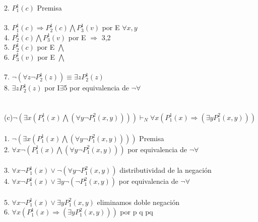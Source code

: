 \documentclass{article}
\begin{document}
2. \hspace{3mm} $P^1_1(c)$ \hspace{5.1cm} Premisa\\ \\
3. \hspace{3mm} $P^1_1(c) \Rightarrow P^1_2(c)\bigwedge P^1_3(v)$ \hspace{2.4cm} por E $\forall x,y$\\
4. \hspace{3mm} $P^1_2(c)\bigwedge P^1_3(v)$ \hspace{3.8cm} por E $\Rightarrow$ 3,2\\
5. \hspace{3mm} $P^1_2(c)$ \hspace{5.1cm} por E $\bigwedge$\\
6. \hspace{3mm} $P^1_3(v)$ \hspace{5.1cm} por E $\bigwedge$\\
\\
7. \hspace{3mm} $\neg(\forall z \neg P^1_2(z)) \equiv \exists z P^1_2(z)$\\
8.\hspace{3mm} $\exists z P^1_2(z)$ \hspace{4.8cm} por I$\exists$5 por equivalencia de $\neg\forall$\\
\\
\\
(c)$\neg(\exists x(P^1_1(x) \bigwedge (\forall y \neg P^2_1(x,y)))) \vdash_N \forall x(P^1_1(x) \Rightarrow (\exists y P^2_1(x, y)))$
\\
\\
1. \hspace{3mm} $\neg(\exists x(P^1_1(x) \bigwedge (\forall y \neg P^2_1(x,y))))$ \hspace{1.5cm} Premisa
\\ 
2. \hspace{3mm} $\forall x\neg (P^1_1(x) \bigwedge (\forall y \neg P^2_1(x,y)))$ \hspace{1.8cm} por equivalencia de $\neg\forall$\\ \\
3. \hspace{3mm} $\forall x\neg P^1_1(x) \vee \neg (\forall y \neg P^2_1(x,y))$ \hspace{1.8cm} distributividad de la negación\\
4. \hspace{3mm} $\forall x\neg P^1_1(x) \vee \exists y \neg(\neg P^2_1(x,y))$ \hspace{1.8cm} por equivalencia de $\neg\forall$ \\ \\
5. \hspace{3mm} $\forall x\neg P^1_1(x) \vee \exists y P^2_1(x,y)$ \hspace{2.5cm} eliminamos doble negación \\
6. \hspace{3mm} $\forall x(P^1_1(x) \Rightarrow (\exists y P^2_1(x,y)))$ \hspace{2cm} por p \Rightarrow q \equiv \neg p\vee q \\
\end{document}
